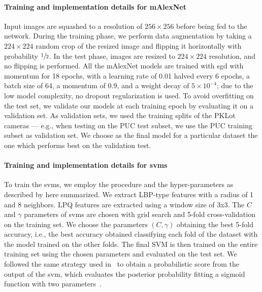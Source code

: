 \paragraph{Training and implementation details for mAlexNet}
Input images are squashed to a resolution of $256\times256$ before being fed to the network.
During the training phase, we perform data augmentation by taking a $224\times224$ random crop of the resized image and flipping it horizontally with probability $\sfrac{1}{2}$.
In the test phase, images are resized to $224\times224$ resolution, and no flipping is performed.
All the mAlexNet models are trained with \gls{sgd} with momentum for 18 epochs, with a learning rate of 0.01 halved every 6 epochs, a batch size of 64, a momentum of 0.9, and a weight decay of $5\times 10^{-4}$;
due to the low model complexity, no dropout regularization is used.
To avoid overfitting on the test set, we validate our models at each training epoch by evaluating it on a validation set.
As validation sets, we used the training splits of the PKLot cameras --- e.g., when testing on the PUC test subset, we use the PUC training subset as validation set.
We choose as the final model for a particular dataset the one which performs best on the validation test.

\paragraph{Training and implementation details for \glspl{svm}}
To train the \glspl{svm}, we employ the procedure and the hyper-parameters as described by \citet{de2015pklot} here summarized.
We extract LBP-type features with a radius of 1 and 8 neighbors.
LPQ features are extracted using a window size of 3x3.
The $C$ and $\gamma$ parameters of \glspl{svm} are chosen with grid search and 5-fold cross-validation on the training set.
We choose the parameters $(C,\gamma)$ obtaining the best 5-fold accuracy, i.e., the best accuracy obtained classifying each fold of the dataset with the model trained on the other folds.
The final SVM is then trained on the entire training set using the chosen parameters and evaluated on the test set.
We followed the same strategy used in~\cite{de2015pklot} to obtain a probabilistic score from the output of the \gls{svm}, which evaluates the posterior probability fitting a sigmoid function with two parameters~\cite{platt1999probabilistic}.

